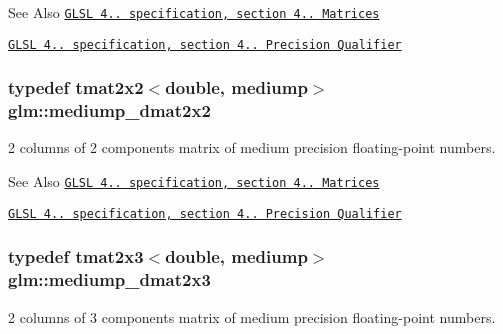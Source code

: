 \begin{DoxySeeAlso}{See Also}
\href{http://www.opengl.org/registry/doc/GLSLangSpec.4.20.8.pdf}{\tt G\-L\-S\-L 4.. specification, section 4.. Matrices} 

\href{http://www.opengl.org/registry/doc/GLSLangSpec.4.20.8.pdf}{\tt G\-L\-S\-L 4.. specification, section 4.. Precision Qualifier} 
\end{DoxySeeAlso}
\hypertarget{group__core__precision_ga949bee59342f1c3258522bacd07ffe95}{
\subsubsection[{mediump\-\_\-dmat2x2}]{\setlength{\rightskip}{0pt plus 5cm}typedef tmat2x2$<$double, mediump$>$ {\bf glm\-::mediump\-\_\-dmat2x2}}}\label{group__core__precision_ga949bee59342f1c3258522bacd07ffe95}
2 columns of 2 components matrix of medium precision floating-\/point numbers.

\begin{DoxySeeAlso}{See Also}
\href{http://www.opengl.org/registry/doc/GLSLangSpec.4.20.8.pdf}{\tt G\-L\-S\-L 4.. specification, section 4.. Matrices} 

\href{http://www.opengl.org/registry/doc/GLSLangSpec.4.20.8.pdf}{\tt G\-L\-S\-L 4.. specification, section 4.. Precision Qualifier} 
\end{DoxySeeAlso}
\hypertarget{group__core__precision_ga0b187380697f66a25000b307db9cb41a}{
\subsubsection[{mediump\-\_\-dmat2x3}]{\setlength{\rightskip}{0pt plus 5cm}typedef tmat2x3$<$double, mediump$>$ {\bf glm\-::mediump\-\_\-dmat2x3}}}\label{group__core__precision_ga0b187380697f66a25000b307db9cb41a}
2 columns of 3 components matrix of medium precision floating-\/point numbers.

